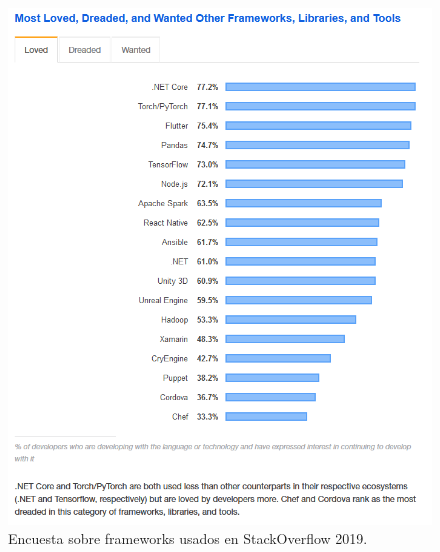 \begin{figure}
    \centering
    \includegraphics[width=1\textwidth]{images/chapter1/stackoverflow_tool.png}
    \caption{Encuesta sobre frameworks usados en StackOverflow 2019.}
    \label{fig:Encuesta sobre frameworks usados StackOverflow 2019}
\end{figure}




